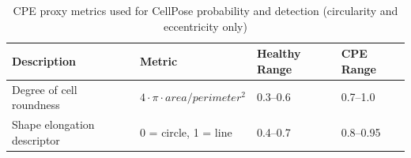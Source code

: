 \begin{table}[htbp]
\centering
\small
\setlength{\tabcolsep}{8pt}
\caption{CPE proxy metrics used for CellPose probability and detection (circularity and eccentricity only)}
\label{tab:cpe-proxies-final}

\begin{tabular}{@{}p{4.7cm}p{4.0cm}p{2.9cm}p{2.7cm}@{}}
\toprule
\textbf{Description} 
& \textbf{Metric} 
& \textbf{Healthy Range} 
& \textbf{CPE Range} \\
\midrule
Degree of cell roundness
& \begin{math}4\cdot\pi\cdot area/perimeter^{2}\end{math}
& 0.3--0.6 
& 0.7--1.0 \\
Shape elongation descriptor
& 0 = circle, 1 = line
& 0.4--0.7 
& 0.8--0.95 \\
\bottomrule
\end{tabular}
\end{table}